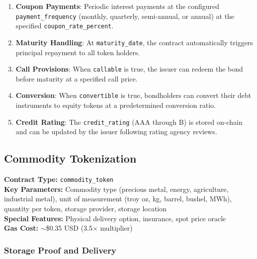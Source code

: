 \documentclass[11pt,a4paper,twoside]{article}
\begin{document}
\begin{enumerate}
  \item \textbf{Coupon Payments}: Periodic interest payments at the configured \texttt{payment\_frequency} (monthly, quarterly, semi-annual, or annual) at the specified \texttt{coupon\_rate\_percent}.

  \item \textbf{Maturity Handling}: At \texttt{maturity\_date}, the contract automatically triggers principal repayment to all token holders.

  \item \textbf{Call Provisions}: When \texttt{callable} is true, the issuer can redeem the bond before maturity at a specified call price.

  \item \textbf{Conversion}: When \texttt{convertible} is true, bondholders can convert their debt instruments to equity tokens at a predetermined conversion ratio.

  \item \textbf{Credit Rating}: The \texttt{credit\_rating} (AAA through B) is stored on-chain and can be updated by the issuer following rating agency reviews.
\end{enumerate}

\subsection{Commodity Tokenization}
\label{subsec:commodities}

\begin{keyinsight}
\textbf{Contract Type:} \texttt{commodity\_token}\\
\textbf{Key Parameters:} Commodity type (precious metal, energy, agriculture, industrial metal), unit of measurement (troy oz, kg, barrel, bushel, MWh), quantity per token, storage provider, storage location\\
\textbf{Special Features:} Physical delivery option, insurance, spot price oracle\\
\textbf{Gas Cost:} $\sim$\$0.35 USD (3.5$\times$ multiplier)
\end{keyinsight}

\subsubsection{Storage Proof and Delivery}
\end{document}
